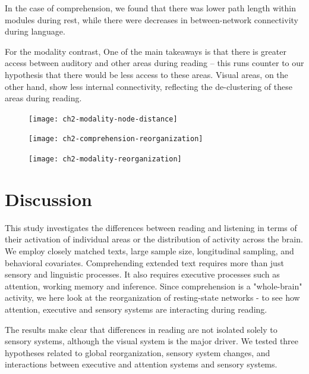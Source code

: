 In the case of comprehension, we found that there was lower path length within modules during rest, while there were decreases in between-network connectivity during language.

For the modality contrast, One of the main takeaways is that there is greater access between auditory and other areas during reading -- this runs counter to our hypothesis that there would be less access to these areas. Visual areas, on the other hand, show less internal connectivity, reflecting the de-clustering of these areas during reading. 

\begin{figure}[t]
	\centering
	\texttt{[image: ch2-modality-node-distance]}
    \caption[Summary of the change in distance between nodes during reading and listening.]{}
	\label{fig:ch2-comprehension-reorganization}
\end{figure}

\begin{figure}[t]
	\centering
	\texttt{[image: ch2-comprehension-reorganization]}
    \caption[Language increases between-network connectivity.]{}
	\label{fig:ch2-comprehension-reorganization}
\end{figure}


\begin{figure}[t]
	\centering
	\texttt{[image: ch2-modality-reorganization]}
    \caption[Reading decreases connectivity within visual and dorsal attention networks.]{}
	\label{fig:ch2-modality-reorganization}
\end{figure}


\section{Discussion}

This study investigates the differences between reading and listening in terms of their activation of individual areas or the distribution of activity across the brain. We employ closely matched texts, large sample size, longitudinal sampling, and behavioral covariates. Comprehending extended text requires more than just sensory and linguistic processes. It also requires executive processes such as attention, working memory and inference. Since comprehension is a "whole-brain" activity, we here look at the reorganization of resting-state networks - to see how attention, executive and sensory systems are interacting during reading.

The results make clear that differences in reading are not isolated solely to sensory systems, although the visual system is the major driver. We tested three hypotheses related to global reorganization, sensory system changes, and interactions between executive and attention systems and sensory systems.


